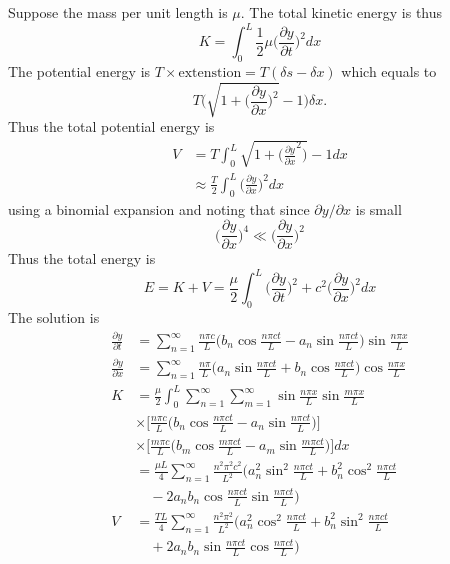 \documentclass[a4paper]{article}
\begin{document}
Suppose the mass per unit length is \(\mu\). The total kinetic energy is thus
\[
  K = \int_{0}^{L} \frac{1}{2} \mu \Big(\frac{\partial y}{\partial t} \Big)^2 dx
\]
The potential energy is \(T \times \text{extenstion} = T(\delta s - \delta x)\) which equals to
\[
  T \Bigg(\sqrt{1+ \Big( \frac{\partial y}{\partial x} \Big)^2} -1 \Bigg) \delta x.
\]
Thus the total potential energy is
\begin{align*}
  V &= T \int_{0}^{L} \sqrt{1+ \Big( \frac{\partial y}{\partial x}^2 \Big)} -1 dx \\
    &\approx \frac{T}{2} \int_{0}^{L} \Big(\frac{\partial y}{\partial x} \Big)^2 dx
\end{align*}
using a binomial expansion and noting that since \(\partial y /\partial x\) is small
\[
  \Big(\frac{\partial y}{\partial x} \Big)^4 \ll \Big(\frac{\partial y}{\partial x} \Big)^2
\]
Thus the total energy is
\[
  E = K + V = \frac{\mu}{2} \int_{0}^{L} \Big( \frac{\partial y}{\partial t} \Big)^2 + c^2 \Big( \frac{\partial y}{\partial x} \Big)^2 dx
\]
The solution is
\begin{align*}
  \frac{\partial y}{\partial t} &= \sum_{n=1}^{\infty} \frac{n\pi c}{L} \Big( b_n \cos \frac{n\pi ct}{L} - a_n \sin \frac{n\pi ct}{L} \Big) \sin \frac{n\pi x}{L} \\
  \frac{\partial y}{\partial x} &= \sum_{n=1}^{\infty} \frac{n\pi }{L} \Big( a_n \sin \frac{n\pi ct}{L} + b_n \cos \frac{n\pi ct}{L} \Big) \cos \frac{n\pi x}{L} \\ 
  K &= \frac{\mu}{2} \int_{0}^{L} \sum_{n=1}^{\infty} \sum_{m=1}^{\infty} \sin \frac{n\pi x}{L } \sin \frac{m\pi x}{L } \\
                                &\times \Big[ \frac{n\pi c}{L} \Big( b_n \cos \frac{n\pi ct}{L} - a_n \sin \frac{n\pi ct}{L} \Big) \Big] \\
                                &\times \Big[ \frac{m\pi c}{L} \Big( b_m \cos \frac{m\pi ct}{L} - a_m \sin \frac{m\pi ct}{L} \Big) \Big] dx\\
                                &= \frac{\mu L}{4} \sum_{n=1}^{\infty} \frac{n^2\pi^2c^2}{L^2} \Big( a_n^2 \sin^2 \frac{n\pi ct}{L} +b_n^2 \cos^2 \frac{n\pi ct}{L} \\
                                & \quad -2a_nb_n \cos \frac{n\pi ct}{L} \sin \frac{n\pi ct}{L} \Big) \\
  V &= \frac{TL}{4} \sum_{n=1}^{\infty} \frac{n^2\pi^2}{L^2} \Big( a_n^2 \cos^2 \frac{n\pi ct}{L} + b_n^2\sin^2 \frac{n\pi ct}{L} \\
                                & \quad +2a_nb_n \sin \frac{n\pi ct}{L} \cos \frac{n\pi ct}{L} \Big)
\end{align*}
\end{document}
